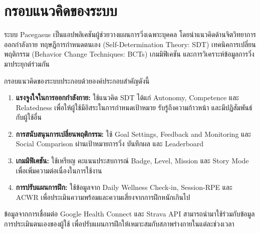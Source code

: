 
\section{กรอบแนวคิดของระบบ}

ระบบ Pacegasus เป็นแอปพลิเคชันผู้ช่วยวางแผนการวิ่งเฉพาะบุคคล โดยนำแนวคิดด้านจิตวิทยาการออกกำลังกาย ทฤษฎีการกำหนดตนเอง (Self-Determination Theory: SDT) เทคนิคการเปลี่ยนพฤติกรรม (Behavior Change Techniques: BCTs) เกมมิฟิเคชัน และการวิเคราะห์ข้อมูลการวิ่งมาประยุกต์ร่วมกัน

กรอบแนวคิดของระบบประกอบด้วยองค์ประกอบสำคัญดังนี้

\begin{enumerate}[label=\arabic*)]
    \item \textbf{แรงจูงใจในการออกกำลังกาย:} ใช้แนวคิด SDT ได้แก่ Autonomy, Competence และ Relatedness เพื่อให้ผู้ใช้มีอิสระในการกำหนดเป้าหมาย รับรู้ถึงความก้าวหน้า และมีปฏิสัมพันธ์กับผู้ใช้อื่น
    \item \textbf{การสนับสนุนการเปลี่ยนพฤติกรรม:} ใช้ Goal Settings, Feedback and Monitoring และ Social Comparison ผ่านเป้าหมายการวิ่ง บันทึกผล และ Leaderboard
    \item \textbf{เกมมิฟิเคชัน:} ใช้เหรียญ คะแนนประสบการณ์ Badge, Level, Mission และ Story Mode เพื่อเพิ่มความต่อเนื่องในการใช้งาน
    \item \textbf{การปรับแผนการฝึก:} ใช้ข้อมูลจาก Daily Wellness Check-in, Session-RPE และ ACWR เพื่อประเมินความพร้อมและความเสี่ยงจากการฝึกหนักเกินไป
\end{enumerate}

ข้อมูลจากการเชื่อมต่อ Google Health Connect และ Strava API สามารถนำมาใช้ร่วมกับข้อมูลการประเมินตนเองของผู้ใช้ เพื่อปรับแผนการฝึกให้เหมาะสมกับสภาพร่างกายในแต่ละช่วงเวลา

